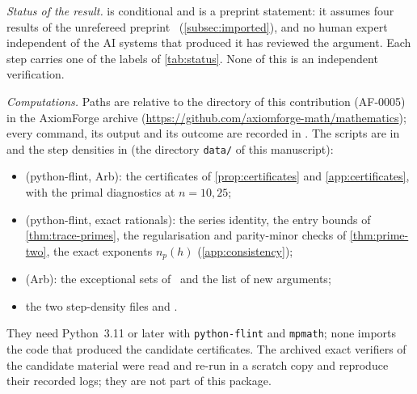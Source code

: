\sloppy

\emph{Status of the result.}  is conditional and is a preprint statement: it assumes four results of
the unrefereed preprint~\Kri{} (\cref{subsec:imported}), and no human expert independent of the AI systems that produced it
has reviewed the argument. Each step carries one of the labels of \cref{tab:status}. None of this is an independent
verification.

\emph{Computations.} Paths are relative to the directory of this contribution (AF-0005) in the AxiomForge archive
(\url{https://github.com/axiomforge-math/mathematics}); every command, its output and its outcome are recorded in
. The scripts are in  and the step densities in
 (the directory \texttt{data/} of this manuscript):
\begin{itemize}
\item {} (python-flint, Arb): the certificates of \cref{prop:certificates} and
\cref{app:certificates}, with the primal diagnostics at $n=10,25$;
\item {} (python-flint, exact rationals): the series identity, the entry bounds of
\cref{thm:trace-primes}, the regularisation and parity-minor checks of \cref{thm:prime-two}, the exact exponents
$n_p(h)$ (\cref{app:consistency});
\item {} (Arb): the exceptional sets of~\Kri{} and the list of new arguments;
\item the two step-density files  and .
\end{itemize}
They need Python~3.11 or later with \texttt{python-flint} and \texttt{mpmath}; none imports the code that produced the
candidate certificates. The archived exact verifiers of the candidate material were read and re-run in a scratch copy
and reproduce their recorded logs; they are not part of this package.

